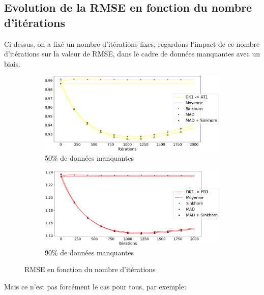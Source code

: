 \documentclass[acmsmall, natbib=false, nonacm]{acmart}
\begin{document}
\subsection{Evolution de la RMSE en fonction du nombre d'itérations}
Ci dessus, on a fixé un nombre d'itérations fixes, regardons l'impact de ce nombre d'itérations sur la valeur de RMSE,
dans le cadre de données manquantes avec un biais.

\begin{figure}[H]
    \centering
    \begin{subfigure}[b]{0.4\textwidth}
        \centering
        \includegraphics[scale=0.14]{images/50_biais_AT1.png}
        \caption{50\% de données manquantes}
        \label{50_biais_AT1}
    \end{subfigure}
    \hfill
    \begin{subfigure}[b]{0.4\textwidth}
        \raggedleft
        \includegraphics[scale=0.14]{images/90_biais_FR1.png}
        \caption{90\% de données manquantes}
        \label{90_biais_FR1}
    \end{subfigure}
       \caption{RMSE en fonction du nombre d'itérations}
\end{figure}

Mais ce n'est pas forcément le cas pour tous, par exemple:
\end{document}
